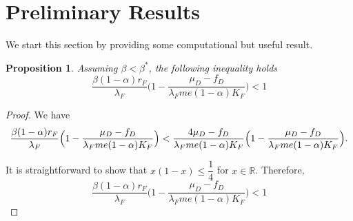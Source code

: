 \documentclass{article}
\newcommand{\lfw}{\lambda_{F}}
\newcommand{\lfw}{\lambda_{F}}
\newtheorem{prop}{Proposition}
\begin{document}
\section{Preliminary Results}

We start this section by providing some computational but useful result.

\begin{prop} \label{propBeta}
Assuming $\beta < \beta^*$, the following inequality holds
$$
\dfrac{\beta (1-\alpha) r_F}{\lfw} \Big(1 - \dfrac{\mu_D - f_D}{\lfw m e (1-\alpha) K_F}\Big) < 1
$$
\end{prop}

\begin{proof}
We have
\begin{equation*}
\dfrac{\beta (1-\alpha) r_F}{\lfw} \Big(1 - \dfrac{\mu_D - f_D}{\lfw m e (1-\alpha) K_F}\Big) < \dfrac{4 \mu_D - f_D}{\lfw m e (1-\alpha) K_F} \Big(1 - \dfrac{\mu_D - f_D}{\lfw m e (1-\alpha) K_F}\Big).\\
\end{equation*}

It is straightforward to show that $x(1 - x) \leq \dfrac{1}{4}$ for $x \in \mathbb{R}$. Therefore,
\begin{equation*}
\dfrac{\beta (1-\alpha) r_F}{\lfw} \Big(1 - \dfrac{\mu_D - f_D}{\lfw m e (1-\alpha) K_F}\Big) <  1
\end{equation*}
\end{proof}
\end{document}
